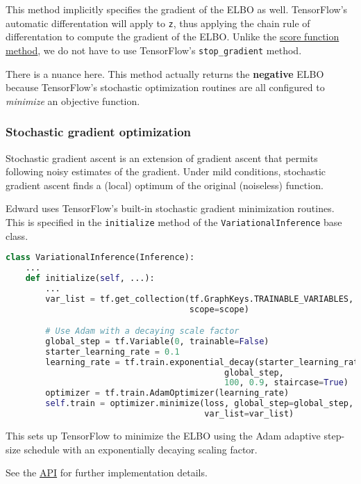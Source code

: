This method implicitly specifies the gradient of the ELBO as well. TensorFlow's
automatic differentation will apply to \texttt{z}, thus applying the chain rule
of differentation to compute the gradient of the ELBO. Unlike the
\href{tut_KLqp_score.html}{score function method},
we do not have to use TensorFlow's \texttt{stop_gradient} method.

There is a nuance here. This method actually returns the \textbf{negative} ELBO
because TensorFlow's stochastic optimization routines are all configured to
\emph {minimize} an objective function.

\subsubsection{Stochastic gradient optimization}

Stochastic gradient ascent is an extension of gradient ascent that permits
following noisy estimates of the gradient. Under mild conditions, stochastic
gradient ascent finds a (local) optimum of the original (noiseless) function.

Edward uses TensorFlow's built-in stochastic gradient minimization routines.
This is specified in the \texttt{initialize} method of the 
\texttt{VariationalInference} base class.

\begin{lstlisting}[language=Python]
class VariationalInference(Inference):
    ...
    def initialize(self, ...):
        ...
        var_list = tf.get_collection(tf.GraphKeys.TRAINABLE_VARIABLES,
                                     scope=scope)

        # Use Adam with a decaying scale factor
        global_step = tf.Variable(0, trainable=False)
        starter_learning_rate = 0.1
        learning_rate = tf.train.exponential_decay(starter_learning_rate,
                                            global_step,
                                            100, 0.9, staircase=True)
        optimizer = tf.train.AdamOptimizer(learning_rate)
        self.train = optimizer.minimize(loss, global_step=global_step,
                                        var_list=var_list)
\end{lstlisting}

This sets up TensorFlow to minimize the ELBO using the Adam adaptive step-size
schedule with an exponentially decaying scaling factor.

See the \href{api/index.html}{API} for further implementation details.
